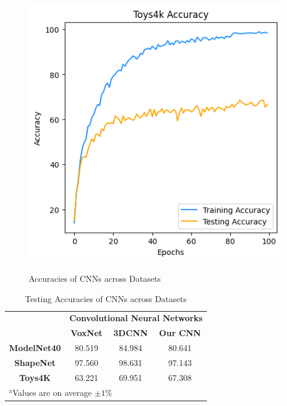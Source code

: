 \documentclass[conference]{IEEEtran}
\newcommand{\ra}[1]{\renewcommand{\arraystretch}{#1}}
\begin{document}
\begin{figure}
{        \includegraphics[scale=0.4]{Images/OurCNN/Toys4K/acc.png}
    }%
    \caption{Accuracies of CNNs across Datasets}
    \label{fig:Acc}
\end{figure}

\begin{table}[htbp]
    \caption{Testing Accuracies of CNNs across Datasets}
    \ra{1.2}
    \begin{center}
    \begin{tabular}{|c|c|c|c|}
    \hline
    &\multicolumn{3}{|c|}{\textbf{Convolutional Neural Networks}} \\
    \cline{2-4}
    & \textbf{VoxNet} & \textbf{3DCNN} & \textbf{Our CNN} \\
    \hline
    \textbf{ModelNet40} & 80.519 & 84.984 & 80.641 \\
    \hline
    \textbf{ShapeNet} & 97.560 & 98.631 & 97.143 \\
    \hline
    \textbf{Toys4K} & 63.221 & 69.951 & 67.308 \\
    \hline
    \multicolumn{4}{l}{$^{\mathrm{a}}$Values are on average $\pm 1\%$}.
    \end{tabular}
    \label{tab1}
    \end{center}
\end{table}
\end{document}
